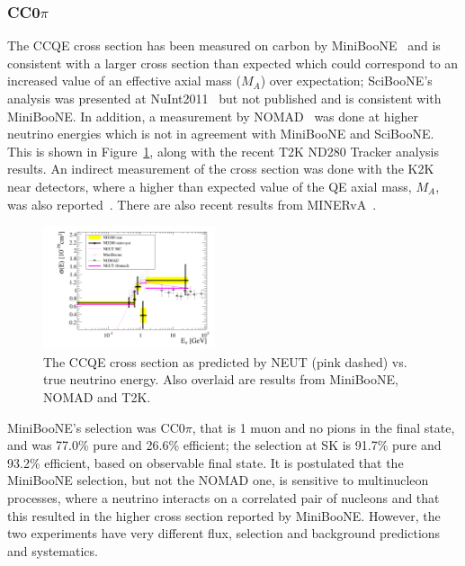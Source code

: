 
\subsubsection{\label{sec:cc0pi}CC0$\pi$}

The CCQE \numu cross section has been measured on carbon by MiniBooNE~\cite{AguilarArevalo:2010zc} and is consistent with a larger cross section than expected which could correspond to an increased value of an effective axial mass ($M_A$) over expectation; SciBooNE's analysis was presented at NuInt2011~\cite{sciboone-nuint2011} but not published and is consistent with MiniBooNE. In addition, a measurement by NOMAD~\cite{Lyubushkin:2008pe} was done at higher neutrino energies which is not in agreement with MiniBooNE and SciBooNE. This is shown in Figure~\ref{fig:ccqe}, along with the recent T2K ND280 Tracker analysis results. An indirect measurement of the cross section was done with the K2K near detectors, where a higher than expected value of the QE axial mass, $M_A$, was also reported~\cite{Gran:2006jn}. There are also recent results from MINERvA~\cite{Fiorentini:2013ezn}.

\begin{figure}[htpb]
\begin{center}
      \includegraphics[width=0.45\textwidth] {figures/nd280_miniboone_nomad.png}
\end{center}
\caption{The CCQE cross section as predicted by NEUT (pink dashed) vs. true neutrino energy. Also overlaid are results from MiniBooNE, NOMAD and T2K.}
\label{fig:ccqe}
\end{figure}


MiniBooNE's selection was CC0$\pi$, that is 1 muon and no pions in the final state, and was 77.0\% pure and 26.6\% efficient; the \rmu selection at SK is 91.7\% pure  and 93.2\% efficient, based on observable final state.
It is postulated that the MiniBooNE selection, but not the NOMAD one, is sensitive to multinucleon processes, where a neutrino interacts on a correlated pair of nucleons and that this resulted in the higher cross section reported by MiniBooNE. However, the two experiments have very different flux, selection and background predictions and systematics.

